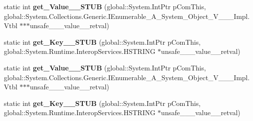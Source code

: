 \begin{DoxyCompactItemize}
static int {\bfseries get\+\_\+\+Value\+\_\+\+\_\+\+S\+T\+UB} (global\+::\+System.\+Int\+Ptr p\+Com\+This, global\+::\+System.\+Collections.\+Generic.\+I\+Enumerable\+\_\+\+A\+\_\+\+System\+\_\+\+Object\+\_\+\+V\+\_\+\+\_\+\+\_\+\+Impl.\+Vtbl $\ast$$\ast$$\ast$unsafe\+\_\+\+\_\+\+\_\+value\+\_\+\+\_\+retval)
\item 
\mbox{\label{struct_system_1_1_collections_1_1_generic_1_1_key_value_pair___a__string__j___system___collectiob611aa8205ecce9d7fe907374986c9f4_ab24c4d2ac8f23946c67b524ad7be63f1}} 
static int {\bfseries get\+\_\+\+Key\+\_\+\+\_\+\+S\+T\+UB} (global\+::\+System.\+Int\+Ptr p\+Com\+This, global\+::\+System.\+Runtime.\+Interop\+Services.\+H\+S\+T\+R\+I\+NG $\ast$unsafe\+\_\+\+\_\+\+\_\+value\+\_\+\+\_\+retval)
\item 
\mbox{\label{struct_system_1_1_collections_1_1_generic_1_1_key_value_pair___a__string__j___system___collectiob611aa8205ecce9d7fe907374986c9f4_a31033e5454134ce392b2f5c4c5c5a91c}} 
static int {\bfseries get\+\_\+\+Value\+\_\+\+\_\+\+S\+T\+UB} (global\+::\+System.\+Int\+Ptr p\+Com\+This, global\+::\+System.\+Collections.\+Generic.\+I\+Enumerable\+\_\+\+A\+\_\+\+System\+\_\+\+Object\+\_\+\+V\+\_\+\+\_\+\+\_\+\+Impl.\+Vtbl $\ast$$\ast$$\ast$unsafe\+\_\+\+\_\+\+\_\+value\+\_\+\+\_\+retval)
\item 
\mbox{\label{struct_system_1_1_collections_1_1_generic_1_1_key_value_pair___a__string__j___system___collectiob611aa8205ecce9d7fe907374986c9f4_ab24c4d2ac8f23946c67b524ad7be63f1}} 
static int {\bfseries get\+\_\+\+Key\+\_\+\+\_\+\+S\+T\+UB} (global\+::\+System.\+Int\+Ptr p\+Com\+This, global\+::\+System.\+Runtime.\+Interop\+Services.\+H\+S\+T\+R\+I\+NG $\ast$unsafe\+\_\+\+\_\+\+\_\+value\+\_\+\+\_\+retval)
\item 
\mbox{\label{struct_system_1_1_collections_1_1_generic_1_1_key_value_pair___a__string__j___system___collectiob611aa8205ecce9d7fe907374986c9f4_a31033e5454134ce392b2f5c4c5c5a91c}} 

\end{DoxyCompactItemize}
